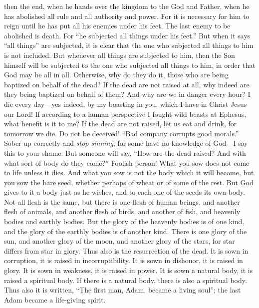 \begin{biblechapter}
\verse then the end, when he hands over the kingdom to the God and Father, when he has abolished all rule and all authority and power.
\verse For it is necessary for him to reign until he has put all his enemies under his feet.
\verse The last enemy to be abolished is death.
\verse For “he subjected all things under his feet.” But when it says “all things” are subjected, it is clear that the one who subjected all things to him is not included.
\verse But whenever all things are subjected to him, then the Son himself will be subjected to the one who subjected all things to him, in order that God may be all in all.
\verse Otherwise, why do they do it, those who are being baptized on behalf of the dead? If the dead are not raised at all, why indeed are they being baptized on behalf of them?
\verse And why are we in danger every hour?
\verse I die every day—yes indeed, by my boasting in you, which I have in Christ Jesus our Lord!
\verse If according to a human perspective I fought wild beasts at Ephesus, what benefit is it to me? If the dead are not raised, let us eat and drink, for tomorrow we die.
\verse Do not be deceived! “Bad company corrupts good morals.”
\verse Sober up correctly and \textit{stop sinning}, for some have no knowledge of God—I say this to your shame.
 But someone will say, “How are the dead raised? And with what sort of body do they come?”
\verse Foolish person! What you sow does not come to life unless it dies.
\verse And what you sow is not the body which it will become, but you sow the bare seed, whether perhaps of wheat or of some of the rest.
\verse But God gives to it a body just as he wishes, and to each one of the seeds its own body.
\verse Not all flesh is the same, but there is one flesh of human beings, and another flesh of animals, and another flesh of birds, and another of fish,
\verse and heavenly bodies and earthly bodies. But the glory of the heavenly bodies is of one kind, and the glory of the earthly bodies is of another kind.
\verse There is one glory of the sun, and another glory of the moon, and another glory of the stars, for star differs from star in glory.
\verse Thus also is the resurrection of the dead. It is sown in corruption, it is raised in incorruptibility.
\verse It is sown in dishonor, it is raised in glory. It is sown in weakness, it is raised in power.
\verse It is sown a natural body, it is raised a spiritual body. If there is a natural body, there is also a spiritual body.
\verse Thus also it is written, “The first man, Adam, became a living soul”; the last Adam became a life-giving spirit.

\end{biblechapter}
